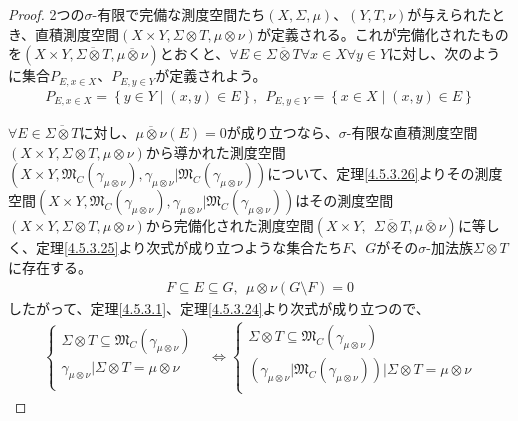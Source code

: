 \documentclass[dvipdfmx]{jsarticle}
\begin{document}
\begin{proof}
2つの$\sigma$-有限で完備な測度空間たち$(X,\varSigma,\mu)$、$(Y,T,\nu)$が与えられたとき、直積測度空間$(X \times Y, \varSigma \otimes T, \mu \otimes \nu)$が定義される。これが完備化されたものを$\left( X \times Y, \overline{\varSigma \otimes T},\overline{\mu \otimes \nu} \right)$とおくと、$\forall E \in \overline{\varSigma \otimes T}\forall x \in X\forall y \in Y$に対し、次のように集合$P_{E,x \in X}$、$P_{E,y \in Y}$が定義されよう。
\begin{align*}
P_{E,x \in X} = \left\{ y \in Y \middle| (x,y) \in E \right\},\ \ P_{E,y \in Y} = \left\{ x \in X \middle| (x,y) \in E \right\}
\end{align*}\par
$\forall E \in \overline{\varSigma \otimes T}$に対し、$\overline{\mu \otimes \nu}(E) = 0$が成り立つなら、$\sigma$-有限な直積測度空間$(X \times Y, \varSigma \otimes T, \mu \otimes \nu)$から導かれた測度空間$\left( X \times Y, \mathfrak{M}_{C}\left( \gamma_{\mu \otimes \nu} \right), \gamma_{\mu \otimes \nu}|\mathfrak{M}_{C}\left( \gamma_{\mu \otimes \nu} \right) \right)$について、定理\ref{4.5.3.26}よりその測度空間$\left( X \times Y, \mathfrak{M}_{C}\left( \gamma_{\mu \otimes \nu} \right), \gamma_{\mu \otimes \nu}|\mathfrak{M}_{C}\left( \gamma_{\mu \otimes \nu} \right) \right)$はその測度空間$(X \times Y, \varSigma \otimes T, \mu \otimes \nu)$から完備化された測度空間$\left( X \times Y,\ \ \overline{\varSigma \otimes T}, \overline{\mu \otimes \nu} \right)$に等しく、定理\ref{4.5.3.25}より次式が成り立つような集合たち$F$、$G$がその$\sigma$-加法族$\varSigma \otimes T$に存在する。
\begin{align*}
F \subseteq E \subseteq G,\ \ \mu \otimes \nu(G \setminus F) = 0
\end{align*}
したがって、定理\ref{4.5.3.1}、定理\ref{4.5.3.24}より次式が成り立つので、
\begin{align*}
\left\{ \begin{matrix}
\varSigma \otimes T \subseteq \mathfrak{M}_{C}\left( \gamma_{\mu \otimes \nu} \right) \\
\gamma_{\mu \otimes \nu}|\varSigma \otimes T = \mu \otimes \nu \\
\end{matrix} \right. &\Leftrightarrow \left\{ \begin{matrix}
\varSigma \otimes T \subseteq \mathfrak{M}_{C}\left( \gamma_{\mu \otimes \nu} \right) \\
\left( \gamma_{\mu \otimes \nu}|\mathfrak{M}_{C}\left( \gamma_{\mu \otimes \nu} \right) \right)|\varSigma \otimes T = \mu \otimes \nu \\

\end{matrix}
\end{align*}
\end{proof}
\end{document}
